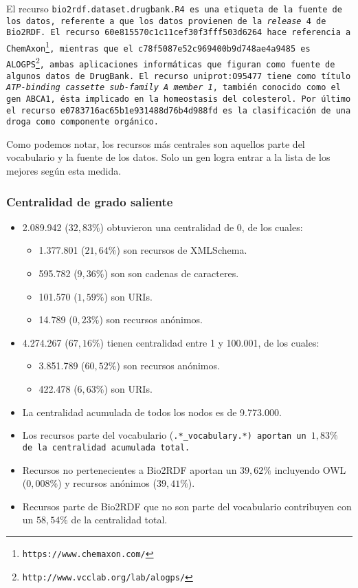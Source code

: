 El recurso \tt{bio2rdf.dataset.drugbank.R4} es una etiqueta de la fuente de los
datos, referente a que los datos provienen de la \emph{release} 4 de Bio2RDF.
El recurso \tt{60e815570c1c11cef30f3fff503d6264} hace referencia a 
ChemAxon\footnote{https://www.chemaxon.com/},
mientras que el \tt{c78f5087e52c969400b9d748ae4a9485} es 
ALOGPS\footnote{http://www.vcclab.org/lab/alogps/}, ambas aplicaciones
informáticas que figuran como fuente de algunos datos de DrugBank.
El recurso \tt{uniprot:O95477} tiene como título \emph{ATP-binding cassette
sub-family A member 1}, también conocido como el gen ABCA1, ésta implicado en
la homeostasis del colesterol. Por último el recurso 
\tt{e0783716ac65b1e931488d76b4d988fd} es la clasificación de una droga como
componente orgánico.

Como podemos notar, los recursos más centrales son aquellos parte del
vocabulario y la fuente de los datos.
Solo un gen logra entrar a la lista de los mejores según esta medida.

\subsubsection{Centralidad de grado saliente}
\begin{itemize}
  \item 2.089.942 ($32,83\%$) obtuvieron una centralidad de 0, de los cuales:
    \begin{itemize}
      \item 1.377.801 ($21,64\%$) son recursos de XMLSchema.
      \item 595.782 ($9,36\%$) son son cadenas de caracteres.
      \item 101.570 ($1,59\%$) son URIs.
      \item 14.789 ($0,23\%$) son recursos anónimos.
    \end{itemize}
  \item
    4.274.267 ($67,16\%$) tienen centralidad entre 1 y 100.001, de los cuales:
    \begin{itemize}
      \item 3.851.789 ($60,52\%$) son recursos anónimos.
      \item 422.478 ($6,63\%$) son URIs.
    \end{itemize}
  \item La centralidad acumulada de todos los nodos es de 9.773.000.
  \item 
    Los recursos parte del vocabulario (\tt{.*\_vocabulary.*}) aportan un 
    $1,83\%$ de la centralidad acumulada total.
  \item
    Recursos no pertenecientes a Bio2RDF aportan un $39,62\%$ incluyendo OWL 
    ($0,008\%$) y recursos anónimos ($39,41\%$).
  \item 
    Recursos parte de Bio2RDF que no son parte del vocabulario contribuyen con
    un $58,54\%$ de la centralidad total.
\end{itemize}


